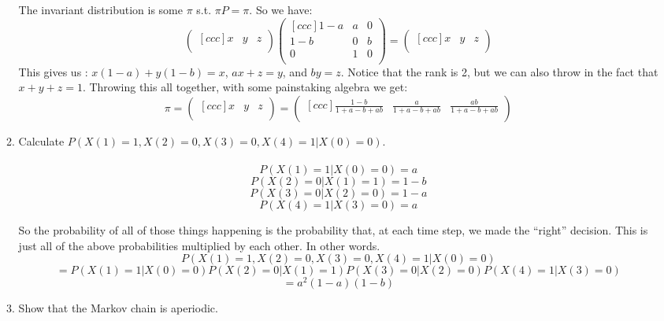 \begin{enumerate}
\begin{enumerate}
        The invariant distribution is some $\pi$ s.t. $\pi P = \pi$.
        So we have:
        $$
        \begin{pmatrix}[ccc]
          x & y & z\\
        \end{pmatrix}        
        \begin{pmatrix}[ccc]
          1-a & a & 0\\
          1-b & 0 & b\\          
          0   & 1 & 0\\
        \end{pmatrix}
        =
        \begin{pmatrix}[ccc]
          x & y & z\\
        \end{pmatrix}
        $$
        This gives us : $x(1-a) + y(1-b) = x$, $ax + z = y$, and $by = z$. Notice that the rank is 2, but we can also throw in the fact that $x + y + z = 1$. Throwing this all together, with some painstaking algebra we get:
        $$
        \pi
        =
        \begin{pmatrix}[ccc]
          x & y & z\\
        \end{pmatrix}        
        =
        \begin{pmatrix}[ccc]
          \frac{1-b}{1+a-b+ab} & \frac{a}{1+a-b+ab} & \frac{ab}{1+a-b+ab}\\
        \end{pmatrix}        
        $$
      \item Calculate $P( X(1) = 1, X(2) = 0, X(3) = 0, X(4) = 1 | X(0) = 0)$.\\\\

        $$P(X(1) = 1 | X(0) = 0) = a$$
        $$P(X(2) = 0 | X(1) = 1) = 1-b$$
        $$P(X(3) = 0 | X(2) = 0) = 1-a$$
        $$P(X(4) = 1 | X(3) = 0) = a$$

        So the probability of all of those things happening is the probability that, at each time step, we made the ``right'' decision. This is just all of the above probabilities multiplied by each other. In other words.
        $$P( X(1) = 1, X(2) = 0, X(3) = 0, X(4) = 1 | X(0) = 0)$$
        $$= P(X(1) = 1 | X(0) = 0)P(X(2) = 0 | X(1) = 1)P(X(3) = 0 | X(2) = 0)P(X(4) = 1 | X(3) = 0)$$
        $$=a^2(1-a)(1-b)$$
      \item Show that the Markov chain is aperiodic.\\\\


\end{enumerate}
\end{enumerate}
